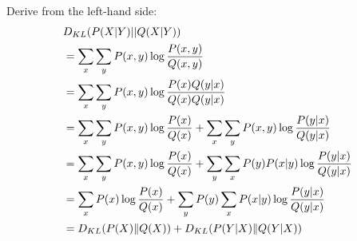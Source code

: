 \begin{answer}
Derive from the left-hand side:
\begin{align}
	&D_{KL}(P(X|Y)||Q(X|Y)) \\
	&= \sum_x \sum_y P(x,y) \log \frac{P(x,y)}{Q(x,y)} \\
	&= \sum_x \sum_y P(x,y) \log \frac{P(x)Q(y|x)}{Q(x)Q(y|x)} \\
	&= \sum_x \sum_y P(x,y) \log \frac{P(x)}{Q(x)} + \sum_x \sum_y P(x,y) \log \frac{P(y|x)}{Q(y|x)} \\
	&= \sum_x \sum_y P(x,y) \log \frac{P(x)}{Q(x)} + \sum_y \sum_x P(y)P(x|y) \log \frac{P(y|x)}{Q(y|x)} \\
	&= \sum_x P(x) \log \frac{P(x)}{Q(x)} + \sum_y P(y) \sum_x P(x|y) \log \frac{P(y|x)}{Q(y|x)} \\
	&= D_{KL}(P(X)\|Q(X)) + D_{KL}(P(Y|X)\|Q(Y|X))
\end{align}
\end{answer}
